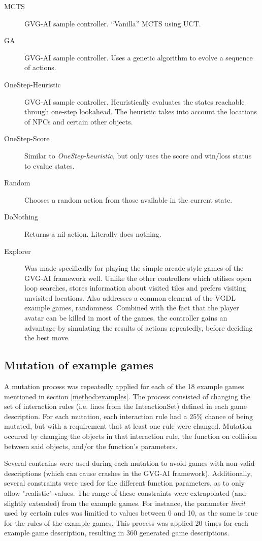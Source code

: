 \documentclass{llncs}
\begin{document}
\begin{description}
	\item [MCTS] GVG-AI sample controller. ``Vanilla'' MCTS using UCT.
	\item [GA] GVG-AI sample controller. Uses a genetic algorithm to evolve a sequence of actions.
	\item [OneStep-Heuristic] GVG-AI sample controller. Heuristically evaluates the states reachable through one-step lookahead. The heuristic takes into account the locations of NPCs and certain other objects.
    \item [OneStep-Score] Similar to \emph{OneStep-heuristic}, but only uses the score and win/loss status to evalue states.
    \item [Random] Chooses a random action from those available in the current state.
	\item [DoNothing] Returns a nil action. Literally does nothing.
	\item [Explorer] Was made specifically for playing the simple arcade-style games of the GVG-AI framework well. Unlike the other controllers which utilises open loop searches, stores information about visited tiles and prefers visiting unvisited locations. Also addresses a common element of the VGDL example games, randomness. Combined with the fact that the player avatar can be killed in most of the games, the controller gains an advantage by simulating  the results of actions repeatedly, before deciding the best move.

\end{description}


\subsection{Mutation of example games}
\label{method:mutation}
A mutation process was repeatedly applied for each of the 18 example games mentioned in section \ref{method:examples}. 
The process consisted of changing the set of interaction rules (i.e. lines from the InteactionSet) defined in each game description.
For each mutation, each interaction rule had a $25\%$ chance of being mutated, but with a requirement that at least one rule were changed. 
Mutation occured by changing the objects in that interaction rule, the function on collision between said objects, and/or the function's parameters.

Several contrains were used during each mutation to avoid games with non-valid descriptions (which can cause crashes in the GVG-AI framework).
Additionally, several constraints were used for the different function parameters, as to only allow "realistic" values. 
The range of these constraints were extrapolated (and slightly extended) from the example games. 
For instance, the parameter \emph{limit} used by certain rules was limitied to values between 0 and 10, as the same is true for the rules of the example games. 
This process was applied 20 times for each example game description, resulting in 360 generated game descriptions.
\end{document}
